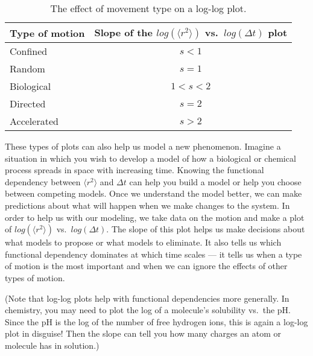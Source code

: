\begin{table}[h!]
	\centering
	\begin{tabular}{|l|c|}
	\hline 
	Type of motion & Slope of the $log(\langle r^{2} \rangle)$ vs.\ $log(\Delta t)$ plot \\ 
	\hline 
	Confined & $s < 1$ \\ 
	\hline 
	Random & $s = 1$ \\ 
	\hline 
	Biological & $1 < s < 2$ \\ 
	\hline 
	Directed & $s = 2$ \\ 
	\hline 
	Accelerated & $s > 2$ \\ 
	\hline 
	\end{tabular} 
	\caption{The effect of movement type on a log-log plot.}
	\label{tab:logPlt}
\end{table}
These types of plots can also help us model a new phenomenon. 
Imagine a situation in which you wish to develop a model of how a biological or chemical process spreads in space with increasing time. 
Knowing the functional dependency between $\langle r^{2} \rangle$ and $\Delta t$ can help you build a model or help you choose between competing models. 
Once we understand the model better, we can make predictions about what will happen when we make changes to the system. 
In order to help us with our modeling, we take data on the motion and make a plot of $log(\langle r^{2} \rangle)$ vs.\ $log(\Delta t)$. 
The slope of this plot helps us make decisions about what models to propose or what models to eliminate. 
It also tells us which functional dependency dominates at which time scales — it tells us when a type of motion is the most important and when we can ignore the effects of other types of motion.
\par
(Note that log-log plots help with functional dependencies more generally. 
In chemistry, you may need to plot the log of a molecule's solubility vs.\ the pH.
Since the pH is the log of the number of free hydrogen ions, this is again a log-log plot in disguise! 
Then the slope can tell you how many charges an atom or molecule has in solution.)
